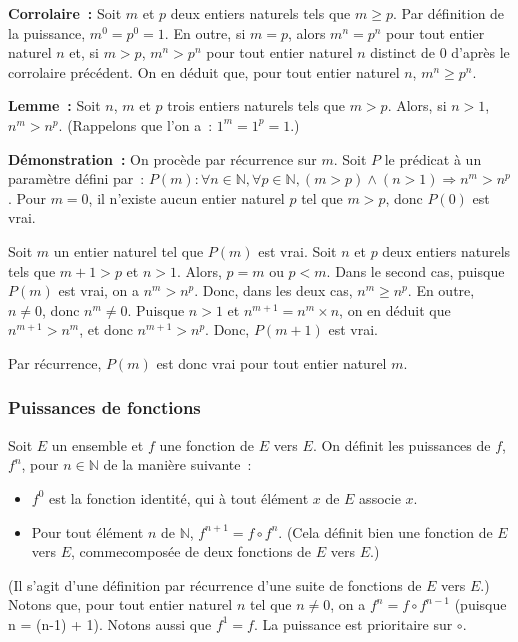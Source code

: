 \medskip

\noindent\textbf{Corrolaire :} 
    Soit $m$ et $p$ deux entiers naturels tels que $m \geq p$.
    Par définition de la puissance, $m^0 = p^0 = 1$.
    En outre, si $m = p$, alors $m^n = p^n$ pour tout entier naturel $n$ et, si $m > p$, $m^n > p^n$ pour tout entier naturel $n$ distinct de $0$ d'après le corrolaire précédent.
    On en déduit que, pour tout entier naturel $n$, $m^n \geq p^n$.

\medskip

\noindent\textbf{Lemme :} Soit $n$, $m$ et $p$ trois entiers naturels tels que $m > p$. 
    Alors, si $n > 1$, $n^m > n^p$. 
    (Rappelons que l'on a : $1^m = 1^p = 1$.)

\medskip

\noindent\textbf{Démonstration :} On procède par récurrence sur $m$. 
    Soit $P$ le prédicat à un paramètre défini par : $P(m): \forall n \in \mathbb{N}, \forall p \in \mathbb{N}, (m > p) \wedge (n > 1) \Rightarrow n^m > n^p$. 
    Pour $m=0$, il n'existe aucun entier naturel $p$ tel que $m > p$, donc $P(0)$ est vrai. 

    Soit $m$ un entier naturel tel que $P(m)$ est vrai. 
    Soit $n$ et $p$ deux entiers naturels tels que $m+1 > p$ et $n > 1$. 
    Alors, $p = m$ ou $p < m$. 
    Dans le second cas, puisque $P(m)$ est vrai, on a $n^m > n^p$. 
    Donc, dans les deux cas, $n^m \geq n^p$. 
    En outre, $n \neq 0$, donc $n^m \neq 0$.
    Puisque $n > 1$ et $n^{m+1} = n^m \times n$, on en déduit que $n^{m+1} > n^m$, et donc $n^{m+1} > n^p$. 
    Donc, $P(m+1)$ est vrai. 

    Par récurrence, $P(m)$ est donc vrai pour tout entier naturel $m$.

   \done 


\subsubsection{Puissances de fonctions}

Soit $E$ un ensemble et $f$ une fonction de $E$ vers $E$. 
On définit les puissances de $f$, $f^n$, pour $n \in \mathbb{N}$ de la manière suivante :
\begin{itemize}[nosep]
    \item $f^0$ est la fonction identité, qui à tout élément $x$ de $E$ associe $x$. 
    \item Pour tout élément $n$ de $\mathbb{N}$, $f^{n+1} = f \circ f^n$. 
        (Cela définit bien une fonction de $E$ vers $E$, commecomposée de deux fonctions de $E$ vers $E$.)
\end{itemize}
(Il s'agit d'une définition par récurrence d'une suite de fonctions de $E$ vers $E$.) 
Notons que, pour tout entier naturel $n$ tel que $n \neq 0$, on a $f^{n} = f \circ f^{n-1}$ (puisque n = (n-1) + 1).
Notons aussi que $f^1 = f$. 
La puissance est prioritaire sur $\circ$.

